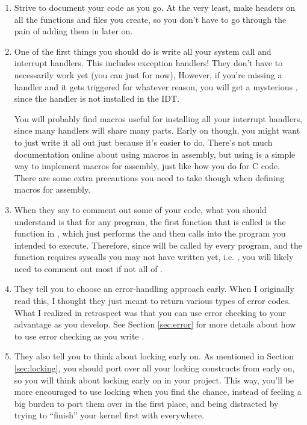 \documentclass{article}
\begin{document}
\begin{enumerate}
  \item Strive to document your code as you go. At the very least, make
   headers on all the functions and files you create, so you
  don't have to go through the pain of adding them in later on.
  
  \item One of the first things you should do is write all your system call
  and interrupt handlers. This includes exception handlers! They don't have
  to necessarily work yet (you can just  for now), However, if
  you're missing a handler and it gets triggered for whatever reason, you
  will get a mysterious , since the handler is
  not installed in the IDT.
  
  You will probably find macros useful for installing all your interrupt
  handlers, since many handlers will share many parts. Early on though, you
  might want to just write it all out just because it's easier to do. There's
  not much documentation online about using macros in assembly, but using
   is a simple way to implement macros for assembly, just like
  how you do for C code. There are some extra precautions you need to take
  though when defining macros for assembly.
  
  \item When they say to comment out some of your 
  code, what you should understand is that for any program, the first
  function that is called is the function in , which just performs
  the  and then calls  into the program you
  intended to execute. Therefore, since  will be
  called by every program, and the function requires syscalls you may not
  have written yet, i.e. , you will likely need to comment out
  most if not all of .

  \label{tip:autostack}

  \item They tell you to choose an error-handling approach early. When I
  originally read this, I thought they just meant to return various types of
  error codes. What I realized in retrospect was that you can use error
  checking to your advantage as you develop. See Section \ref{sec:error} for
  more details about how to use error checking as you write .

  \item They also tell you to think about locking early on. As mentioned in
  Section \ref{sec:locking}, you should port over all your locking constructs
  from  early on, so you will think about locking early on in your
  project. This way, you'll be more encouraged to use locking when you find
  the chance, instead of feeling a big burden to port them over in the first
  place, and being distracted by trying to ``finish'' your kernel first with
   everywhere.
  

\end{enumerate}
\end{document}
